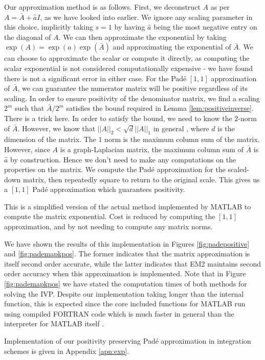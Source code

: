 Our approximation method is as follows.
First, we deconstruct $A$ as per $A = \bar{A} + \hat{a}I$, as we have looked into earlier.
We ignore any scaling parameter in this choice, implicitly taking $s=1$ by having $\hat{a}$ being the most negative entry on the diagonal of $A$.
We can then approximate the exponential by taking $\exp(A) = \exp(a)\exp(\bar{A})$ and approximating the exponential of $\bar{A}$.
We can choose to approximate the scalar or compute it directly, as computing the scalar exponential is not considered computationally expensive - we have found there is not a significant error in either case.
For the Pad\'e $[1,1]$ approximation of $\bar{A}$, we can guarantee the numerator matrix will be positive regardless of its scaling.
In order to ensure positivity of the denominator matrix, we find a scaling $2^m$ such that $\bar{A}/2^m$ satisfies the bound required in Lemma \ref{lem:positiveinverse}.
There is a trick here. In order to satisfy the bound, we need to know the $2$-norm of $\bar{A}$.
However, we know that $||A||_2 < \sqrt{d}||A||_1$ in general \cite{horn2012matrix}, where $d$ is the dimension of the matrix.
The $1$ norm is the maximum column sum of the matrix. However, since $A$ is a graph-Laplacian matrix, the maximum column sum of $\bar{A}$ is $\hat{a}$ by construction.
Hence we don't need to make any computations on the properties on the matrix.
We compute the Pad\'e approximation for the scaled-down matrix, then repeatedly square to return to the original scale.
This gives us a $[1,1]$ Pad\'e approximation which guarantees positivity.

This is a simplified version of the actual method implemented by MATLAB to compute the matrix exponential.
Cost is reduced by computing the $[1,1]$ approximation,
and by not needing to compute any matrix norms.

We have shown the results of this implementation in Figures \ref{fig:padepositive} and \ref{fig:pademapkpos}.
The former indicates that the matrix approximation is itself second order accurate,
while the latter indicates that EM2 maintains second order accuracy when this approximation is implemented.
Note that in Figure \ref{fig:pademapkpos} we have stated the computation times of both methods for solving the IVP.
Despite our implementation taking longer than the internal function,
this is expected since the core included functions for MATLAB run using compiled FORTRAN code which is much faster in general than the interpreter for MATLAB itself \cite{moler2020history}.

Implementation of our positivity preserving Pad\'e approximation in integration schemes is given in Appendix \ref{apn:exp}.

